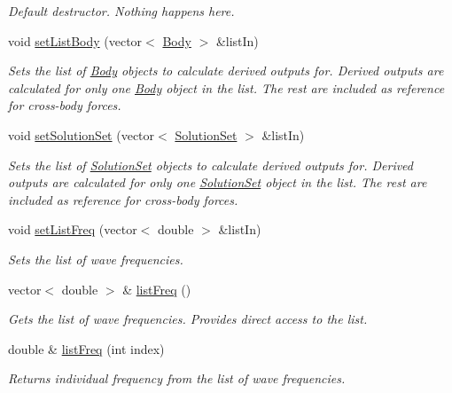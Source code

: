 \begin{DoxyCompactItemize}
\begin{DoxyCompactList}\small\item\em Default destructor. Nothing happens here. \end{DoxyCompactList}\item 
void \hyperlink{class_outputs_body_adf05eb2fc8ffba1c18825163305aea4d}{set\-List\-Body} (vector$<$ \hyperlink{class_body}{Body} $>$ \&list\-In)
\begin{DoxyCompactList}\small\item\em Sets the list of \hyperlink{class_body}{Body} objects to calculate derived outputs for. Derived outputs are calculated for only one \hyperlink{class_body}{Body} object in the list. The rest are included as reference for cross-\/body forces. \end{DoxyCompactList}\item 
void \hyperlink{class_outputs_body_a0d7b68e5b9726370ad3e6522aa9328f4}{set\-Solution\-Set} (vector$<$ \hyperlink{class_solution_set}{Solution\-Set} $>$ \&list\-In)
\begin{DoxyCompactList}\small\item\em Sets the list of \hyperlink{class_solution_set}{Solution\-Set} objects to calculate derived outputs for. Derived outputs are calculated for only one \hyperlink{class_solution_set}{Solution\-Set} object in the list. The rest are included as reference for cross-\/body forces. \end{DoxyCompactList}\item 
void \hyperlink{class_outputs_body_a14e8b435963f1772b48c7038658685ee}{set\-List\-Freq} (vector$<$ double $>$ \&list\-In)
\begin{DoxyCompactList}\small\item\em Sets the list of wave frequencies. \end{DoxyCompactList}\item 
vector$<$ double $>$ \& \hyperlink{class_outputs_body_a6b28621ef475c1d917270e2259e1629f}{list\-Freq} ()
\begin{DoxyCompactList}\small\item\em Gets the list of wave frequencies. Provides direct access to the list. \end{DoxyCompactList}\item 
double \& \hyperlink{class_outputs_body_aea5ac6ef687c5dc979817b967bc9dfe2}{list\-Freq} (int index)
\begin{DoxyCompactList}\small\item\em Returns individual frequency from the list of wave frequencies. \end{DoxyCompactList}\item 

\end{DoxyCompactItemize}
